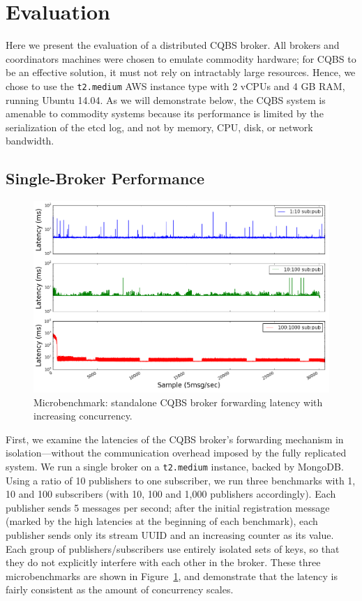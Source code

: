 \section{Evaluation}
\label{section:evaluation}

Here we present the evaluation of a distributed CQBS broker.
All brokers and coordinators machines were chosen to emulate commodity hardware; for CQBS to be an effective solution, it must not rely on intractably large resources.
Hence, we chose to use the \texttt{t2.medium} AWS instance type with 2 vCPUs and 4 GB RAM, running Ubuntu 14.04.
As we will demonstrate below, the CQBS system is amenable to commodity systems because its performance is limited by the serialization of the etcd log, and not by memory, CPU, disk, or network bandwidth.

\subsection{Single-Broker Performance}

\begin{figure}[t]
\centering
\includegraphics[width=\linewidth]{figs/singlenodelatency.png}
\caption{Microbenchmark: standalone CQBS broker forwarding latency with increasing concurrency.}
\label{fig:singlenodelatency}
\end{figure}

First, we examine the latencies of the CQBS broker's forwarding mechanism in isolation---without the communication overhead imposed by the fully replicated system.
We run a single broker on a \texttt{t2.medium} instance, backed by MongoDB\@.
Using a ratio of 10 publishers to one subscriber, we run three benchmarks with 1, 10 and 100 subscribers (with 10, 100 and 1,000 publishers accordingly).
Each publisher sends 5 messages per second; after the initial registration message (marked by the high latencies at the beginning of each benchmark), each publisher sends only its stream UUID and an increasing counter as its value.
Each group of publishers/subscribers use entirely isolated sets of keys, so that they do not explicitly interfere with each other in the broker.
These three microbenchmarks are shown in Figure~\ref{fig:singlenodelatency}, and demonstrate that the latency is fairly consistent as the amount of concurrency scales.

